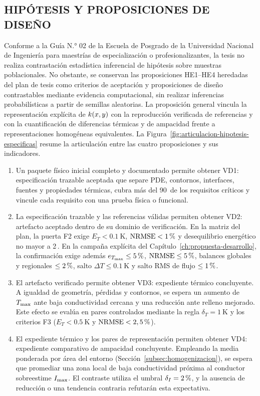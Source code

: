 \subsection{HIPÓTESIS Y PROPOSICIONES DE DISEÑO}
\label{subsec:proposiciones-diseno}

Conforme a la Guía N.° 02 de la Escuela de Posgrado de la Universidad Nacional de Ingeniería para maestrías de especialización o profesionalizantes, la tesis no realiza contrastación estadística inferencial de hipótesis sobre muestras poblacionales. No obstante, se conservan las proposiciones HE1--HE4 heredadas del plan de tesis como criterios de aceptación y proposiciones de diseño contrastables mediante evidencia computacional, sin realizar inferencias probabilísticas a partir de semillas aleatorias. La proposición general vincula la representación explícita de $k(x,y)$ con la reproducción verificada de referencias y con la cuantificación de diferencias térmicas y de ampacidad frente a representaciones homogéneas equivalentes. La Figura~\ref{fig:articulacion-hipotesis-especificas} resume la articulación entre las cuatro proposiciones y sus indicadores.

\begin{enumerate}[label=HE\arabic*.]
  \item Un paquete físico inicial completo y documentado permite obtener VD1: especificación trazable aceptada que separe PDE, contornos, interfaces, fuentes y propiedades térmicas, cubra más del 90\,\pct{} de los requisitos críticos y vincule cada requisito con una prueba física o funcional.
  \item La especificación trazable y las referencias válidas permiten obtener VD2: artefacto aceptado dentro de su dominio de verificación. En la matriz del plan, la puerta F2 exige $E_T < \SI{0,1}{\kelvin}$, $\mathrm{NRMSE} < 1\,\pct{}$ y desequilibrio energético no mayor a 2\,\pct{}. En la campaña explícita del Capítulo~\ref{ch:propuesta-desarrollo}, la confirmación exige además $e_{\Tmax} \le 5\,\pct{}$, $\mathrm{NRMSE} \le 5\,\pct{}$, balances globales y regionales $\le 2\,\pct{}$, salto $\Delta T \le \SI{0,1}{\kelvin}$ y salto RMS de flujo $\le 1\,\pct{}$.
  \item El artefacto verificado permite obtener VD3: expediente térmico concluyente. A igualdad de geometría, pérdidas y contornos, se espera un aumento de $T_{\max}$ ante baja conductividad cercana y una reducción ante relleno mejorado. Este efecto se evalúa en pares controlados mediante la regla $\delta_T = \SI{1}{\kelvin}$ y los criterios F3 ($E_T < \SI{0,5}{\kelvin}$ y $\mathrm{NRMSE} < 2,5\,\pct{}$).
  \item El expediente térmico y los pares de representación permiten obtener VD4: expediente comparativo de ampacidad concluyente. Empleando la media ponderada por área del entorno (Sección~\ref{subsec:homogenizacion}), se espera que promediar una zona local de baja conductividad próxima al conductor sobreestime $I_{\max}$. El contraste utiliza el umbral $\delta_I = 2\,\pct{}$, y la ausencia de reducción o una tendencia contraria refutarán esta expectativa.
\end{enumerate}

